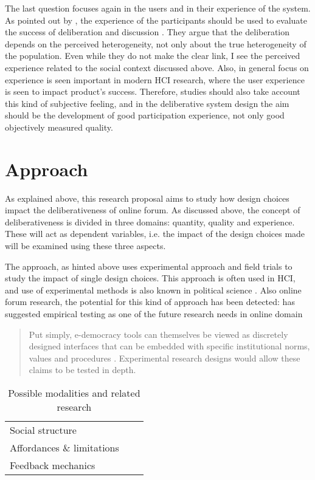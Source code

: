 \documentclass{article}
\begin{document}
The last question focuses again in the users and in their experience of the system. As pointed out by , the experience of the participants should be used to evaluate the success of deliberation and discussion . They argue that the deliberation depends on the perceived heterogeneity, not only about the true heterogeneity of the population. Even while they do not make the clear link, I see the perceived experience related to the social context discussed above. Also, in general focus on experience is seen important in modern HCI research, where the user experience is seen to impact product's success. Therefore, studies should also take account this kind of subjective feeling, and in the deliberative system design the aim should be the development of good participation experience, not only good objectively measured quality.

\section{Approach}

As explained above, this research proposal aims to study how design choices impact the deliberativeness of online forum. As discussed above, the concept of deliberativeness is divided in three domains: quantity, quality and experience. These will act as dependent variables, i.e. the impact of the design choices made will be examined using these three aspects.

The approach, as hinted above uses experimental approach and field trials to study the impact of single design choices. This approach is often used in HCI, and use of experimental methods is also known in political science \cite{brown11,green03,stoker10}. Also online forum research, the potential for this kind of approach has been detected:  has suggested empirical testing as one of the future research needs in online domain

\begin{quote}
Put simply, e-democracy tools can themselves be viewed as discretely designed interfaces that can be embedded with specific institutional norms, values and procedures \cite{wright07}. Experimental research designs would allow these claims to be tested in depth.
\end{quote}

\begin{table}
\begin{tabular}{lc|l}
Social structure & & \cite{sukumaran11,underhill03} \\
Affordances \& limitations & & \cite{eklundh94,danet98,donath99} \\ 
Feedback mechanics & &
\end{tabular} 
\caption{Possible modalities and related research}
\label{tab:modalities}
\end{table}
\end{document}
